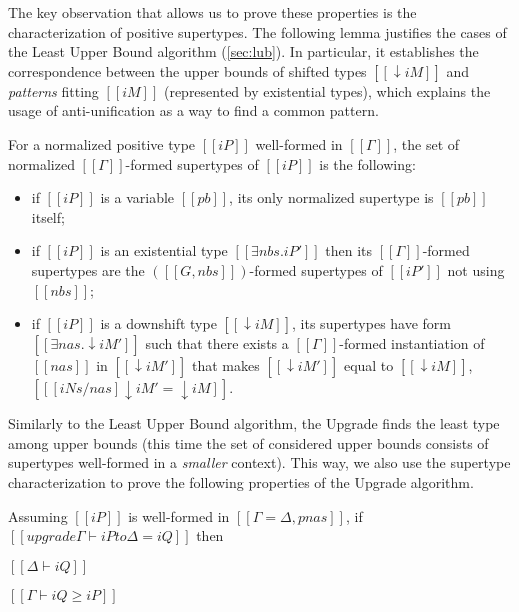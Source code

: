     The key observation that allows us to prove these properties is
    the characterization of positive supertypes. 
    The following lemma justifies the cases of the Least Upper Bound algorithm
    (\cref{sec:lub}). In particular, it establishes
    the correspondence between the upper bounds of shifted types $[[↓iM]]$ and
    \emph{patterns} fitting $[[iM]]$ (represented by existential types), which 
    explains the usage of anti-unification as a way to find a common pattern. 

    \begin{lemma*}
        \label{lemma:char-supertypes}
        For a normalized positive type $[[iP]]$ well-formed in $[[Γ]]$,
        the set of normalized $[[Γ]]$-formed supertypes of $[[iP]]$ is the following:
        \begin{itemize}
            \item if $[[iP]]$ is a variable $[[pb]]$, its only normalized supertype is $[[pb]]$ itself;
            \item if $[[iP]]$ is an existential type $[[ ∃nbs.iP' ]]$ then 
                its $[[Γ]]$-formed supertypes are the $([[G, nbs]])$-formed supertypes of $[[iP']]$ not using $[[nbs]]$;
            \item if $[[iP]]$ is a downshift type $[[↓iM]]$, 
                its supertypes have form $[[∃nas.↓iM']]$ such that there exists
                a $[[Γ]]$-formed instantiation of $[[nas]]$ in $[[↓iM']]$
                that makes $[[↓iM']]$ equal to $[[↓iM]]$, \ie $[[ [iNs/nas] ↓iM' = ↓iM ]]$.
        \end{itemize}
    \end{lemma*}

    Similarly to the Least Upper Bound algorithm, the Upgrade finds the least type among upper bounds
    (this time the set of considered upper bounds consists of supertypes well-formed in a \emph{smaller} context).
    This way, we also use the supertype characterization to prove the following properties of the Upgrade algorithm. 

    \begin{lemma*}
        Assuming $[[iP]]$ is well-formed in $[[Γ = Δ, pnas]]$,
        if $[[upgrade Γ ⊢ iP to Δ = iQ]]$
        then
        \begin{enumerate*}
            \item $[[Δ ⊢ iQ]]$
            \item $[[Γ ⊢ iQ ≥ iP]]$
        \end{enumerate*}
    \end{lemma*}

